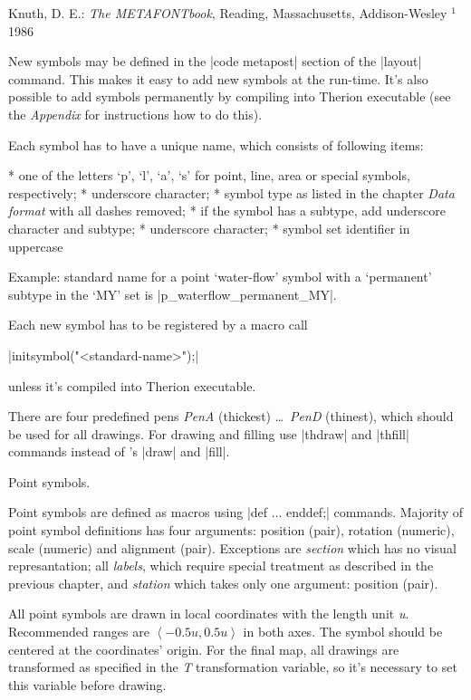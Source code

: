 \list
  Knuth, D. E.: {\it The METAFONTbook}, Reading, Massachusetts, Addison-Wesley
    $^1$1986
\endlist

New symbols may be defined in the |code metapost| section of the |layout| 
command. This makes it easy to add new symbols at the run-time. It's also 
possible to add symbols permanently by compiling into Therion executable 
(see the {\it Appendix} for instructions how to do this).

Each symbol has to have a unique name, which consists of following items:

\list 
* one of the letters `p', `l', `a', `s' for point, line, area or special 
  symbols, respectively;
* underscore character;
* symbol type as listed in the chapter {\it Data format\/} with all dashes
  removed;
* if the symbol has a subtype, add underscore character and subtype;
* underscore character;
* symbol set identifier in uppercase
\endlist

Example: standard name for a point `water-flow' symbol with a `permanent' 
subtype in the `MY' set is |p_waterflow_permanent_MY|. 

Each new symbol has to be registered by a macro call

|initsymbol("<standard-name>");|

unless it's compiled into Therion executable. 

There are four predefined pens {\it PenA} (thickest) \dots\ {\it PenD} 
(thinest), which should be used for all drawings. 
For drawing and filling use |thdraw| and |thfill| commands instead of \MP's 
|draw| and |fill|.

\subsubchapter Point symbols.

Point symbols are defined as macros using |def ... enddef;| commands.
Majority of point symbol definitions has four arguments: 
position (pair), rotation (numeric), scale (numeric) and alignment (pair). 
Exceptions are {\it section} which has no visual represantation; 
all {\it labels}, which require special treatment as described in the
previous chapter, and 
{\it station} which takes only one argument: position (pair).

All point symbols are drawn in local coordinates with the length unit {\it u}. 
Recommended ranges are $\left<-0.5u,0.5u\right>$ in both axes. The symbol 
should be centered at the coordinates' origin.
For the final map, all drawings are transformed as specified in the {\it T\/} 
transformation variable, so it's necessary to set this variable before drawing. 

